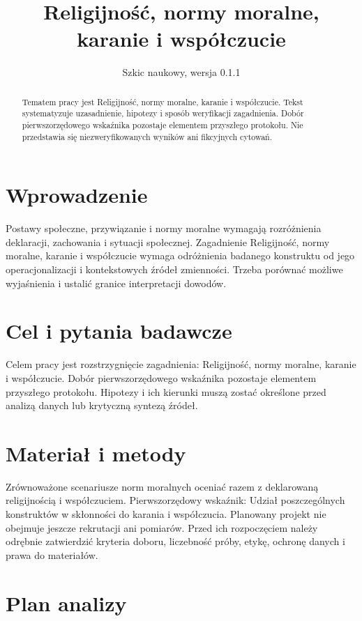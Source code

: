 \documentclass[11pt,a4paper]{article}
\title{Religijność, normy moralne, karanie i współczucie}
\author{}
\date{Szkic naukowy, wersja 0.1.1}
\begin{document}
\maketitle

\begin{abstract}

Tematem pracy jest Religijność, normy moralne, karanie i współczucie. Tekst systematyzuje uzasadnienie, hipotezy i sposób weryfikacji zagadnienia. Dobór pierwszorzędowego wskaźnika pozostaje elementem przyszłego protokołu. Nie przedstawia się niezweryfikowanych wyników ani fikcyjnych cytowań.

\end{abstract}

\section{Wprowadzenie}

Postawy społeczne, przywiązanie i normy moralne wymagają rozróżnienia deklaracji, zachowania i sytuacji społecznej. Zagadnienie Religijność, normy moralne, karanie i współczucie wymaga odróżnienia badanego konstruktu od jego operacjonalizacji i kontekstowych źródeł zmienności. Trzeba porównać możliwe wyjaśnienia i ustalić granice interpretacji dowodów.

\section{Cel i pytania badawcze}

Celem pracy jest rozstrzygnięcie zagadnienia: Religijność, normy moralne, karanie i współczucie. Dobór pierwszorzędowego wskaźnika pozostaje elementem przyszłego protokołu. Hipotezy i ich kierunki muszą zostać określone przed analizą danych lub krytyczną syntezą źródeł.

\section{Materiał i metody}

Zrównoważone scenariusze norm moralnych oceniać razem z deklarowaną religijnością i współczuciem. Pierwszorzędowy wskaźnik: Udział poszczególnych konstruktów w skłonności do karania i współczucia. Planowany projekt nie obejmuje jeszcze rekrutacji ani pomiarów. Przed ich rozpoczęciem należy odrębnie zatwierdzić kryteria doboru, liczebność próby, etykę, ochronę danych i prawa do materiałów.

\section{Plan analizy}
\end{document}
